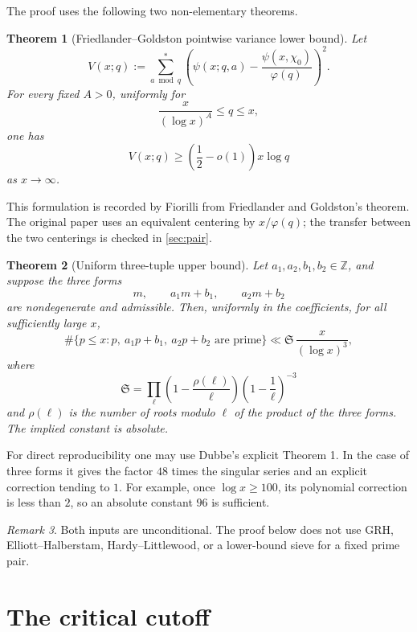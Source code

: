 \documentclass[11pt]{article}
\newtheorem{theorem}{Theorem}[section]
\theoremstyle{definition}
\theoremstyle{remark}
\newtheorem{remark}[theorem]{Remark}
\newcommand{\ph}{\varphi}
\newcommand{\Ss}{\mathfrak S}
\newcommand{\1}{\mathbf 1}
\begin{document}
The proof uses the following two non-elementary theorems.

\begin{theorem}[Friedlander--Goldston pointwise variance lower bound]\label{thm:FG}
Let
\[
 V(x;q):=\sum_{a\bmod q}^{*}
 \left(\psi(x;q,a)-\frac{\psi(x,\chi_0)}{\ph(q)}\right)^2.
\]
For every fixed $A>0$, uniformly for
\[
 \frac{x}{(\log x)^A}\le q\le x,
\]
one has
\[
 V(x;q)\ge\left(\frac12-o(1)\right)x\log q
\]
as $x\to\infty$.
\end{theorem}

This formulation is recorded by Fiorilli from Friedlander and Goldston's theorem.  The original paper uses an equivalent centering by $x/\ph(q)$; the transfer between the two centerings is checked in \cref{sec:pair}.

\begin{theorem}[Uniform three-tuple upper bound]\label{thm:Dubbe}
Let $a_1,a_2,b_1,b_2\in\mathbb Z$, and suppose the three forms
\[
 m,\qquad a_1m+b_1,\qquad a_2m+b_2
\]
are nondegenerate and admissible.  Then, uniformly in the coefficients, for all sufficiently large $x$,
\[
 \#\{p\le x:p,\ a_1p+b_1,\ a_2p+b_2\text{ are prime}\}
 \ll \Ss\,\frac{x}{(\log x)^3},
\]
where
\[
 \Ss=\prod_{\ell}
 \left(1-\frac{\rho(\ell)}{\ell}\right)
 \left(1-\frac1\ell\right)^{-3}
\]
and $\rho(\ell)$ is the number of roots modulo $\ell$ of the product of the three forms.
The implied constant is absolute.
\end{theorem}

For direct reproducibility one may use Dubbe's explicit Theorem 1.  In the case of three forms it gives the factor $48$ times the singular series and an explicit correction tending to $1$.  For example, once $\log x\ge100$, its polynomial correction is less than $2$, so an absolute constant $96$ is sufficient.

\begin{remark}
Both inputs are unconditional.  The proof below does not use GRH, Elliott--Halberstam, Hardy--Littlewood, or a lower-bound sieve for a fixed prime pair.
\end{remark}

\section{The critical cutoff}
\end{document}
